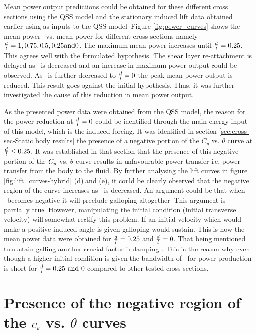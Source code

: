 Mean power output predictions could be obtained for these different cross sections using the QSS model and the stationary induced lift data obtained earlier using as inputs to the QSS model. Figure \ref{fig:power_curves} shows the mean power \massdamp\ vs. mean power for different cross sections namely $\frac{d}{l}=1,0.75,0.5,0.25 \text{and} 0$. The maximum mean power increases until $\frac{d}{l}=0.25$. This agrees well with the formulated hypothesis. The shear layer re-attachment is delayed as \ratio\ is decreased and an increase in maximum power output could be observed. As \ratio\ is further decreased to $\frac{d}{l}=0$ the peak mean power output is reduced. This result goes against the initial hypothesis. Thus, it was further investigated the cause of this reduction in mean power output. 
 
As the presented power data were obtained from the QSS model, the reason for the power reduction at $\frac{d}{l}=0$ could be identified through the main energy input of this model, which is the induced forcing. It was identified in section \ref{sec:cross-sec-Static body results} the presence of a negative portion of the $C_y$ vs. $\theta$ curve at $\frac{d}{l}\leq0.25$. It was established in that section that the presence of this negative portion of the $C_{y}$ vs. $\theta$ curve results in unfavourable power transfer i.e. power transfer from the body to the fluid. By further analysing the lift curves in figure \ref{fig:lift_curves-hybrid} (d) and (e), it could be clearly observed that the negative region of the curve increases as \ratio\ is decreased. An argument could be that when \cy\ becomes negative it will preclude galloping altogether. This argument is partially true. However, manipulating the initial condition (initial transverse velocity) will somewhat rectify this problem. If an initial velocity which would make a positive induced angle is given galloping would sustain. This is how the mean power data were obtained for $\frac{d}{l}=0.25$ and $\frac{d}{l}=0$. That being mentioned to sustain galling another crucial factor is damping \citet{Paidoussis2010}. This is the reason why even though a higher initial condition is given the bandwidth of \massdamp\ for power production is short for $\ratio=0.25\ \text{and}\ 0$ compared to other tested cross sections. 

\section{Presence of the negative region of the $C_{y}$ vs. $\theta$ curves}

